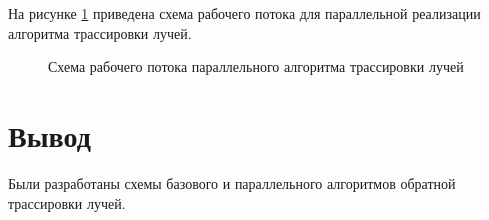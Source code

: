На рисунке \ref{fig:trass_count} приведена схема рабочего потока для параллельной реализации алгоритма трассировки лучей.

\begin{figure}[h!]
	
	
	\caption{Схема рабочего потока параллельного алгоритма трассировки лучей}
	
	\label{fig:trass_count}
	
\end{figure}



\section*{Вывод}

Были разработаны схемы базового и параллельного алгоритмов обратной трассировки лучей.


